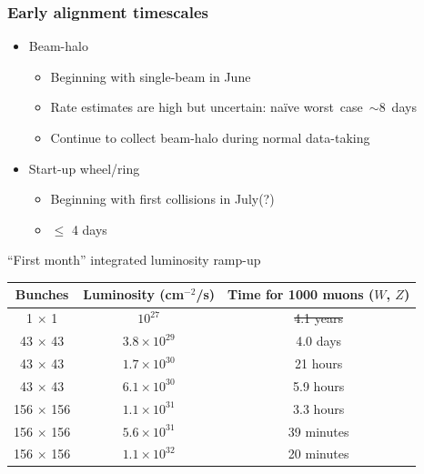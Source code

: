\documentclass[compress]{beamer}
\begin{document}
\begin{frame}
\frametitle{Early alignment timescales}
\begin{itemize}\setlength{\itemsep}{0.4 cm}
\item Beam-halo
\begin{itemize}\setlength{\itemsep}{0.1 cm}
\item Beginning with single-beam in June
\item Rate estimates are high but uncertain: na\"ive \mbox{worst~case~$\sim$8~days\hspace{-1 cm}}
\item Continue to collect beam-halo during normal data-taking
\end{itemize}

\item Start-up wheel/ring
\begin{itemize}
\item Beginning with first collisions in July(?)
\item $\le$ 4 days
\end{itemize}
\end{itemize}
\begin{center}
\small ``First month'' integrated luminosity ramp-up

\vspace{0.1 cm}
\renewcommand{\arraystretch}{1.1}
\begin{tabular}{c c c}
Bunches & Luminosity (cm$^{-2}$/s) & Time for 1000 muons ($W$, $Z$) \\\hline
1 $\times$ 1 & $10^{27}$ & \sout{\hspace{0.5 cm}4.1 years\hspace{0.5 cm}} \\
43 $\times$ 43 & $3.8 \times 10^{29}$ & 4.0 days \\
43 $\times$ 43 & $1.7 \times 10^{30}$ & 21 hours \\
43 $\times$ 43 & $6.1 \times 10^{30}$ & 5.9 hours \\
156 $\times$ 156 & $1.1 \times 10^{31}$ & 3.3 hours \\
156 $\times$ 156 & $5.6 \times 10^{31}$ & 39 minutes \\
156 $\times$ 156 & $1.1 \times 10^{32}$ & 20 minutes \\
\end{tabular}
\end{center}
\end{frame}
\end{document}
